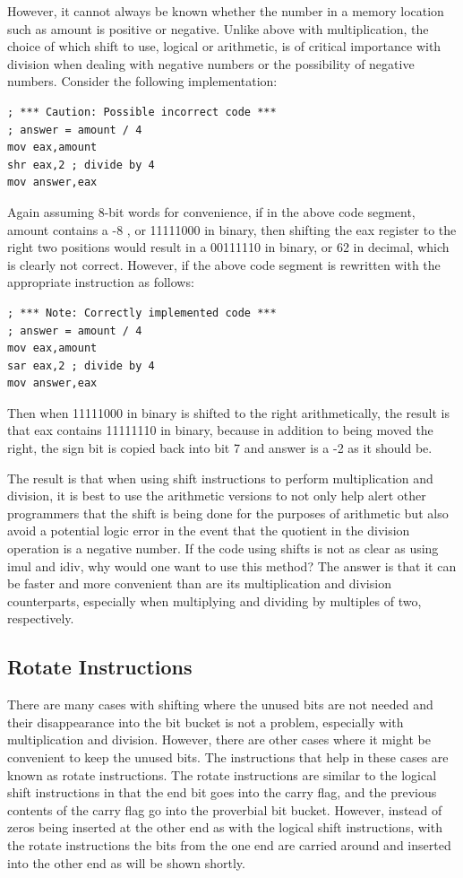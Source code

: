 \documentclass[10pt]{article}
\begin{document}
However, it cannot always be known whether the number in a memory location such as amount is positive or negative. Unlike above with multiplication, the choice of which shift to use, logical or arithmetic, is of critical importance with division when dealing with negative numbers or the possibility of negative numbers. Consider the following implementation:

\begin{verbatim}
; *** Caution: Possible incorrect code ***
; answer = amount / 4
mov eax,amount
shr eax,2 ; divide by 4
mov answer,eax
\end{verbatim}

Again assuming 8-bit words for convenience, if in the above code segment, amount contains a -8 , or 11111000 in binary, then shifting the eax register to the right two positions would result in a 00111110 in binary, or 62 in decimal, which is clearly not correct. However, if the above code segment is rewritten with the appropriate instruction as follows:

\begin{verbatim}
; *** Note: Correctly implemented code ***
; answer = amount / 4
mov eax,amount
sar eax,2 ; divide by 4
mov answer,eax
\end{verbatim}

Then when 11111000 in binary is shifted to the right arithmetically, the result is that eax contains 11111110 in binary, because in addition to being moved the right, the sign bit is copied back into bit 7 and answer is a -2 as it should be.

The result is that when using shift instructions to perform multiplication and division, it is best to use the arithmetic versions to not only help alert other programmers that the shift is being done for the purposes of arithmetic but also avoid a potential logic error in the event that the quotient in the division operation is a negative number. If the code using shifts is not as clear as using imul and idiv, why would one want to use this method? The answer is that it can be faster and more convenient than are its multiplication and division counterparts, especially when multiplying and dividing by multiples of two, respectively.

\subsection*{Rotate Instructions}
There are many cases with shifting where the unused bits are not needed and their disappearance into the bit bucket is not a problem, especially with multiplication and division. However, there are other cases where it might be convenient to keep the unused bits. The instructions that help in these cases are known as rotate instructions. The rotate instructions are similar to the logical shift instructions in that the end bit goes into the carry flag, and the previous contents of the carry flag go into the proverbial bit bucket. However, instead of zeros being inserted at the other end as with the logical shift instructions, with the rotate instructions the bits from the one end are carried around and inserted into the other end as will be shown shortly.
\end{document}
